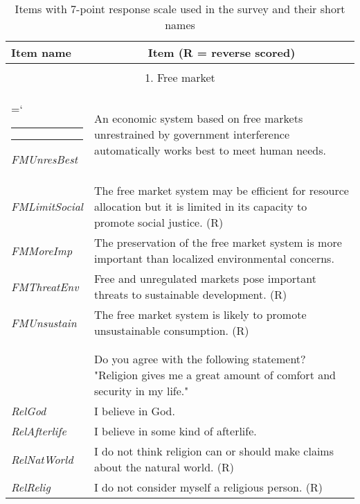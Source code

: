\documentclass[fignum,man]{apa}\usepackage[]{graphicx}\usepackage[]{color}
\makeatletter
\def\nobreakhline{%
	\noalign{\ifnum0=`}\fi
	\penalty\@M
	\futurelet\@let@token\LT@@nobreakhline}
\def\LT@@nobreakhline{%
	\ifx\@let@token\hline
	\global\let\@gtempa\@gobble
	\gdef\LT@sep{\penalty\@M\vskip\doublerulesep}%
	\else
	\global\let\@gtempa\@empty
	\gdef\LT@sep{\penalty\@M\vskip-\arrayrulewidth}%
	\fi
	\ifnum0=`{\fi}%
	\multispan\LT@cols
	\unskip\leaders\hrule\@height\arrayrulewidth\hfill\cr
	\noalign{\LT@sep}%
	\multispan\LT@cols
	\unskip\leaders\hrule\@height\arrayrulewidth\hfill\cr
	\noalign{\penalty\@M}%
	\@gtempa}
\makeatother
\begin{document}
\pagebreak
\begin{longtable}{p{.2\linewidth} p{.8\linewidth}} %

	\caption[]{Items with 7-point response scale 
		used in the survey and their short names\label{tab:items}}\\*
	\hline
	Item name & \multicolumn{1}{c}{Item (R = reverse scored)}  \\*
	\hline

	\\*
\hline

\multicolumn{2}{c}{1. Free market}\\*
\nopagebreak
\nobreakhline
\nopagebreak
\emph{FMUnresBest}&An economic system based on free markets unrestrained by government interference automatically works best to meet human needs. \\*
\emph{FMLimitSocial} &The free market system may be efficient for resource allocation  but it is limited in its capacity to promote social justice. (R)  \\*
\emph{FMMoreImp}&The preservation of the free market system is more important than localized environmental concerns.  \\*
\emph{FMThreatEnv} &Free and unregulated markets pose important threats to sustainable development. (R)  \\*
\emph{FMUnsustain} &The free market system is likely to promote unsustainable consumption. (R) \\

	\\*
	\nobreakhline
	\multicolumn{2}{c}{2. Religiosity}\\*
	\nopagebreak
	\nobreakhline
	\nopagebreak
\emph{RelComf} & Do you agree with the following statement? "Religion gives me a great amount of comfort and security in my life."\\*
\emph{RelGod} & I believe in God.\\*
\emph{RelAfterlife} & I believe in some kind of afterlife.\\*
\emph{RelNatWorld} & I do not think religion can or should make claims about the natural world. (R)\\*
\emph{RelRelig} & I do not consider myself a religious person. (R)\\
	

\end{longtable}
\end{document}
